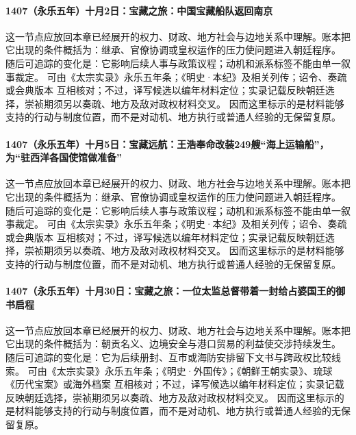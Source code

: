 \paragraph{1407（永乐五年）十月2日：宝藏之旅：中国宝藏船队返回南京} 这一节点应放回本章已经展开的权力、财政、地方社会与边地关系中理解。账本把它出现的条件概括为：继承、官僚协调或皇权运作的压力使问题进入朝廷程序。 随后可追踪的变化是：它影响后续人事与政策议程；动机和派系标签不能由单一叙事裁定。 可由《太宗实录》永乐五年条；《明史·本纪》及相关列传；诏令、奏疏或会典版本 互相核对；不过，译写候选以编年材料定位；实录记载反映朝廷选择，崇祯期须另以奏疏、地方及敌对政权材料交叉。 因而这里标示的是材料能够支持的行动与制度位置，而不是对动机、地方执行或普通人经验的无保留复原。

\paragraph{1407（永乐五年）十月5日：宝藏远航：王浩奉命改装249艘“海上运输船”，为“驻西洋各国使馆做准备”} 这一节点应放回本章已经展开的权力、财政、地方社会与边地关系中理解。账本把它出现的条件概括为：继承、官僚协调或皇权运作的压力使问题进入朝廷程序。 随后可追踪的变化是：它影响后续人事与政策议程；动机和派系标签不能由单一叙事裁定。 可由《太宗实录》永乐五年条；《明史·本纪》及相关列传；诏令、奏疏或会典版本 互相核对；不过，译写候选以编年材料定位；实录记载反映朝廷选择，崇祯期须另以奏疏、地方及敌对政权材料交叉。 因而这里标示的是材料能够支持的行动与制度位置，而不是对动机、地方执行或普通人经验的无保留复原。

\paragraph{1407（永乐五年）十月30日：宝藏之旅：一位太监总督带着一封给占婆国王的御书启程} 这一节点应放回本章已经展开的权力、财政、地方社会与边地关系中理解。账本把它出现的条件概括为：朝贡名义、边境安全与港口贸易的利益使交涉持续发生。 随后可追踪的变化是：它为后续册封、互市或海防安排留下文书与跨政权比较线索。 可由《太宗实录》永乐五年条；《明史·外国传》；《朝鲜王朝实录》、琉球《历代宝案》或海外档案 互相核对；不过，译写候选以编年材料定位；实录记载反映朝廷选择，崇祯期须另以奏疏、地方及敌对政权材料交叉。 因而这里标示的是材料能够支持的行动与制度位置，而不是对动机、地方执行或普通人经验的无保留复原。

